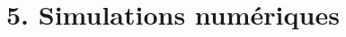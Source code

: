 \documentclass[11pt,french,ignorenonframetext,]{beamer}
\begin{document}







\section{\hfill{}5. Simulations numériques\hfill{}}
\end{document}
